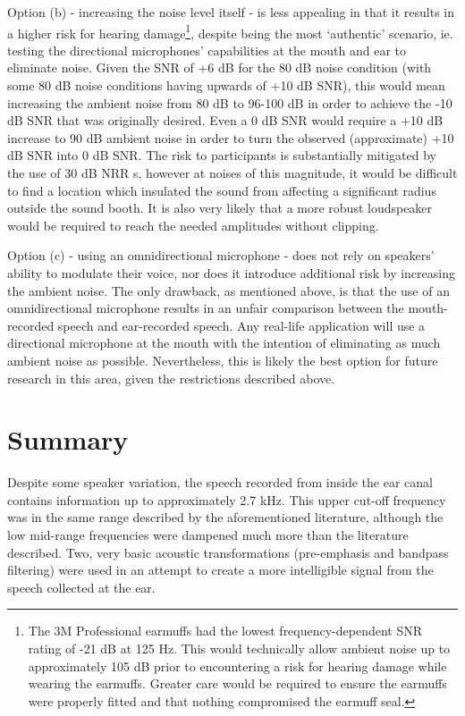 Option (b) - increasing the noise level itself - is less appealing in that it results in a higher risk for hearing damage\footnote{The 3M Professional earmuffs had the lowest frequency-dependent SNR rating of -21 dB at 125 Hz.  This would technically allow ambient noise up to approximately 105 dB prior to encountering a risk for hearing damage while wearing the earmuffs.  Greater care would be required to ensure the earmuffs were properly fitted and that nothing compromised the earmuff seal.}, despite being the most `authentic' scenario, ie. testing the directional microphones' capabilities at the mouth and ear to eliminate noise.  Given the SNR of +6 dB for the 80 dB noise condition (with some 80 dB noise conditions having upwards of +10 dB SNR), this would mean increasing the ambient noise from 80 dB to 96-100 dB in order to achieve the -10 dB SNR that was originally desired.  Even a 0 dB SNR would require a +10 dB increase to 90 dB ambient noise in order to turn the observed (approximate) +10 dB SNR into 0 dB SNR. The risk to participants is substantially mitigated by the use of 30 dB NRR s, however at noises of this magnitude, it would be difficult to find a location which insulated the sound from affecting a significant radius outside the sound booth.  It is also very likely that a more robust loudspeaker would be required to reach the needed amplitudes without clipping.

Option (c) - using an omnidirectional microphone - does not rely on speakers' ability to modulate their voice, nor does it introduce additional risk by increasing the ambient noise.  The only drawback, as mentioned above, is that the use of an omnidirectional microphone results in an unfair comparison between the mouth-recorded speech and ear-recorded speech.  Any real-life application will use a directional microphone at the mouth with the intention of eliminating as much ambient noise as possible.  Nevertheless, this is likely the best option for future research in this area, given the restrictions described above.

\section{Summary}\label{chap2:summary}

Despite some speaker variation, the speech recorded from inside the ear canal contains information up to approximately 2.7 kHz.  This upper cut-off frequency was in the same range described by the aforementioned literature, although the low mid-range frequencies were dampened much more than the literature described.  Two, very basic acoustic transformations (pre-emphasis and bandpass filtering) were used in an attempt to create a more intelligible signal from the speech collected at the ear.

